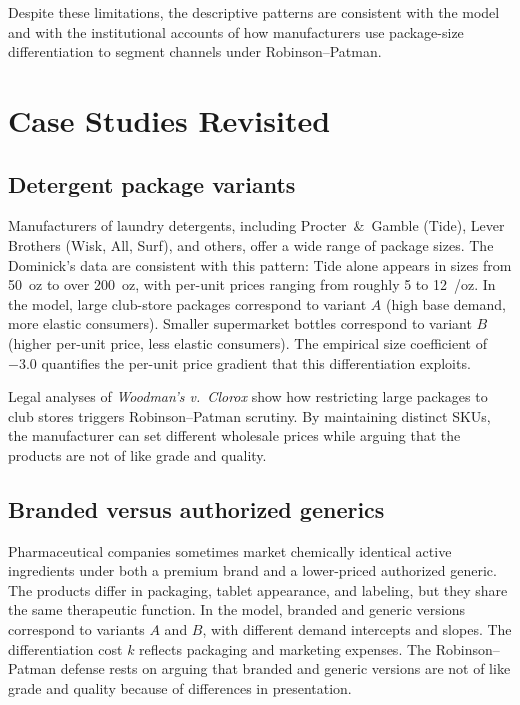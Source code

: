 \documentclass[12pt]{article}
\theoremstyle{definition}
\begin{document}
Despite these limitations, the descriptive patterns are consistent with the model and with the institutional accounts of how manufacturers use package-size differentiation to segment channels under Robinson--Patman.


\section{Case Studies Revisited}\label{sec:cases}

\subsection{Detergent package variants}

Manufacturers of laundry detergents, including Procter~\&~Gamble (Tide), Lever Brothers (Wisk, All, Surf), and others, offer a wide range of package sizes.
The Dominick's data are consistent with this pattern: Tide alone appears in sizes from 50~oz to over 200~oz, with per-unit prices ranging from roughly 5 to 12~\textcent/oz.
In the model, large club-store packages correspond to variant $A$ (high base demand, more elastic consumers). Smaller supermarket bottles correspond to variant $B$ (higher per-unit price, less elastic consumers).
The empirical size coefficient of $-3.0$ quantifies the per-unit price gradient that this differentiation exploits.

Legal analyses of \textit{Woodman's v.\ Clorox} show how restricting large packages to club stores triggers Robinson--Patman scrutiny.
By maintaining distinct SKUs, the manufacturer can set different wholesale prices while arguing that the products are not of like grade and quality.

\subsection{Branded versus authorized generics}

Pharmaceutical companies sometimes market chemically identical active ingredients under both a premium brand and a lower-priced authorized generic.
The products differ in packaging, tablet appearance, and labeling, but they share the same therapeutic function.
In the model, branded and generic versions correspond to variants $A$ and $B$, with different demand intercepts and slopes.
The differentiation cost $k$ reflects packaging and marketing expenses. The Robinson--Patman defense rests on arguing that branded and generic versions are not of like grade and quality because of differences in presentation.
\end{document}
